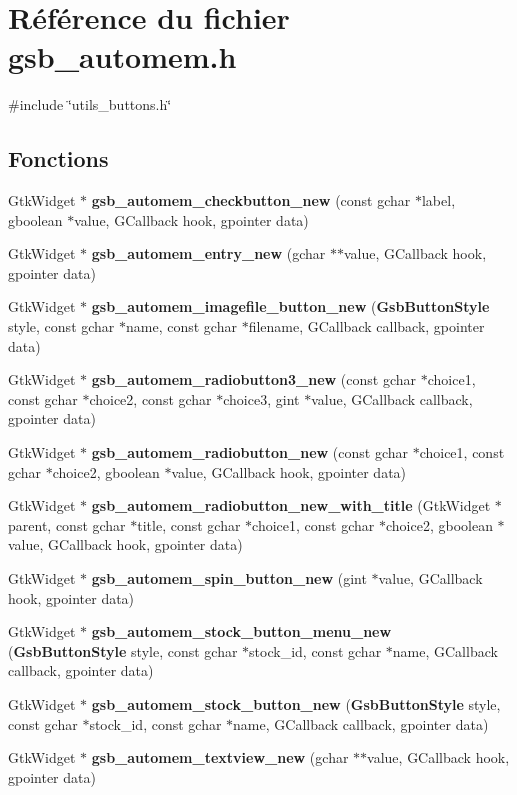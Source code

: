 \section{Référence du fichier gsb\_\-automem.h}
\label{gsb__automem_8h}
{\ttfamily \#include \char`\"{}utils\_\-buttons.h\char`\"{}}\par
\subsection*{Fonctions}
\begin{DoxyCompactItemize}
\item 
GtkWidget $\ast$ {\bf gsb\_\-automem\_\-checkbutton\_\-new} (const gchar $\ast$label, gboolean $\ast$value, GCallback hook, gpointer data)
\item 
GtkWidget $\ast$ {\bf gsb\_\-automem\_\-entry\_\-new} (gchar $\ast$$\ast$value, GCallback hook, gpointer data)
\item 
GtkWidget $\ast$ {\bf gsb\_\-automem\_\-imagefile\_\-button\_\-new} ({\bf GsbButtonStyle} style, const gchar $\ast$name, const gchar $\ast$filename, GCallback callback, gpointer data)
\item 
GtkWidget $\ast$ {\bf gsb\_\-automem\_\-radiobutton3\_\-new} (const gchar $\ast$choice1, const gchar $\ast$choice2, const gchar $\ast$choice3, gint $\ast$value, GCallback callback, gpointer data)
\item 
GtkWidget $\ast$ {\bf gsb\_\-automem\_\-radiobutton\_\-new} (const gchar $\ast$choice1, const gchar $\ast$choice2, gboolean $\ast$value, GCallback hook, gpointer data)
\item 
GtkWidget $\ast$ {\bf gsb\_\-automem\_\-radiobutton\_\-new\_\-with\_\-title} (GtkWidget $\ast$parent, const gchar $\ast$title, const gchar $\ast$choice1, const gchar $\ast$choice2, gboolean $\ast$value, GCallback hook, gpointer data)
\item 
GtkWidget $\ast$ {\bf gsb\_\-automem\_\-spin\_\-button\_\-new} (gint $\ast$value, GCallback hook, gpointer data)
\item 
GtkWidget $\ast$ {\bf gsb\_\-automem\_\-stock\_\-button\_\-menu\_\-new} ({\bf GsbButtonStyle} style, const gchar $\ast$stock\_\-id, const gchar $\ast$name, GCallback callback, gpointer data)
\item 
GtkWidget $\ast$ {\bf gsb\_\-automem\_\-stock\_\-button\_\-new} ({\bf GsbButtonStyle} style, const gchar $\ast$stock\_\-id, const gchar $\ast$name, GCallback callback, gpointer data)
\item 
GtkWidget $\ast$ {\bf gsb\_\-automem\_\-textview\_\-new} (gchar $\ast$$\ast$value, GCallback hook, gpointer data)
\end{DoxyCompactItemize}


